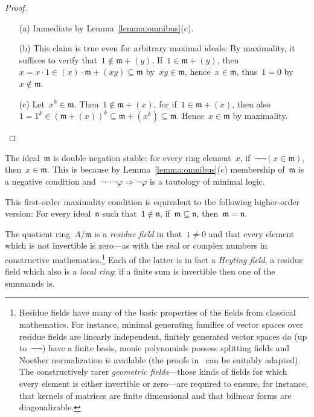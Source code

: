 \documentclass[envcountsect,envcountsame,runningheads]{llncs}
\newcommand{\mmm}{\mathfrak{m}}
\newcommand{\nnn}{\mathfrak{n}}
\renewcommand{\_}{\mathpunct{.}\,}
\begin{document}
\begin{proof}\begin{enumerate}
\item[(a)] Immediate by Lemma~\ref{lemma:omnibus}(c).
\item[(b)] This claim is true even for arbitrary maximal ideals: By maximality, it suffices to verify that~$1 \not\in
\mmm + (y)$. If~$1 \in \mmm + (y)$, then~$x = x\cdot1 \in (x) \cdot \mmm + (xy)
\subseteq \mmm$ by~$xy \in \mmm$, hence~$x \in \mmm$, thus~$1 = 0$ by~$x \not\in
\mmm$.
\item[(c)] Let~$x^k \in \mmm$. Then~$1 \not\in \mmm + (x)$, for if~$1 \in
\mmm + (x)$, then also~$1 = 1^k \in (\mmm + (x))^k \subseteq \mmm + (x^k)
\subseteq \mmm$. Hence~$x \in \mmm$ by maximality.
\end{enumerate}
\end{proof}

\begin{remark}The ideal~$\mmm$ is double negation stable: for every
ring element~$x$, if~$\neg\neg(x \in \mmm)$, then~$x \in \mmm$. This is because
by Lemma~\ref{lemma:omnibus}(c) membership of~$\mmm$ is a negative condition
and~$\neg\neg\neg\varphi \Rightarrow \neg\varphi$ is a tautology of minimal
logic.\end{remark}

This first-order maximality condition is  %
equivalent to the following higher-order version: For every ideal~$\nnn$ such that~$1
\not\in \nnn$, if~$\mmm \subseteq \nnn$, then~$\mmm = \nnn$.

The quotient ring~$A/\mmm$ is a \emph{residue field} in that~$1 \neq 0$
and that every element which is not invertible is zero---as with the real or
complex numbers in constructive mathematics.\footnote{Residue fields have
many of the basic properties of the fields from classical mathematics. For
instance, minimal generating families of vector spaces over residue fields are
linearly independent, finitely generated vector spaces do (up to~$\neg\neg$) have
a finite basis, monic polynomials possess splitting fields and Noether
normalization is available (the proofs
in~\cite{mines-richman-ruitenburg:constructive-algebra} can be suitably
adapted). The constructively rarer \emph{geometric fields}---those kinds of
fields for which every element is either invertible or zero---are required to
ensure, for instance, that kernels of matrices are finite dimensional and that bilinear forms
are diagonalizable.}
Each of the latter is in fact a \emph{Heyting field},
a residue field which also is a \emph{local ring}: if a finite
sum is invertible then one of the summands is.
\end{document}
